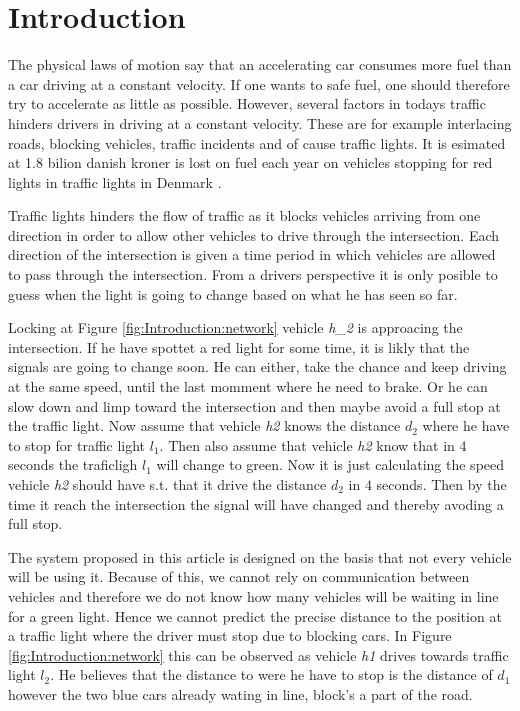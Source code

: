 \section{Introduction}

The physical laws of motion say that an accelerating car consumes more fuel than a car driving at a constant velocity. %
If one wants to safe fuel, one should therefore try to accelerate as little as possible. 
However, several factors in todays traffic hinders drivers in driving at a constant velocity. 
These are for example interlacing roads, blocking vehicles, traffic incidents and of cause traffic lights. 
It is esimated at 1.8 bilion danish kroner is lost on fuel each year on vehicles stopping for red lights in traffic lights in Denmark \cite{Vejdir}.

Traffic lights hinders the flow of traffic as it blocks vehicles arriving from one direction in order to allow other vehicles to drive through the intersection.
Each direction of the intersection is given a time period in which vehicles are allowed to pass through the intersection. 
From a drivers perspective it is only posible to guess when the light is going to change based on what he has seen so far. 

Locking at Figure \ref{fig:Introduction:network} vehicle \textit{h_2} is approacing the intersection. If he have spottet a red light for some time, it is likly that the signals are going to change soon. He can either, take the chance and keep driving at the same speed, until the last momment where he need to brake. Or he can slow down and limp toward the intersection and then maybe avoid a full stop at the traffic light. Now assume that vehicle \textit{h2} knows the distance $d_2$ where he have to stop for traffic light $l_1$. Then also assume that vehicle \textit{h2} know that in $4$ seconds the traficligh $l_1$ will change to green. Now it is just calculating the speed vehicle \textit{h2} should have s.t. that it drive the distance $d_2$ in $4$ seconds. Then by the time it reach the intersection the signal will have changed and thereby avoding a full stop.

The system proposed in this article is designed on the basis that not every vehicle will be using it. 
Because of this, we cannot rely on communication between vehicles and therefore we do not know how many vehicles will be waiting in line for a green light. %
Hence we cannot predict the precise distance to the position at a traffic light where the driver must stop due to blocking cars. In Figure \ref{fig:Introduction:network} this can be observed as vehicle \textit{h1} drives towards traffic light $l_2$. He believes that the distance to were he have to stop is the distance of $d_1$ however the two blue cars already wating in line, block's a part of the road.

